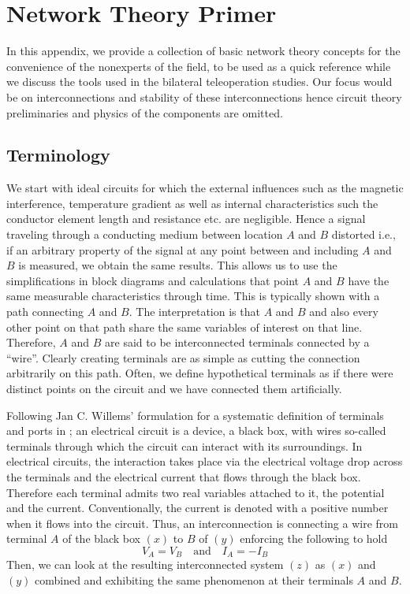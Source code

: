 \chapter{Network Theory Primer}
\label{chap:apdxnetwork}


In this appendix, we provide a collection of basic network theory concepts for the convenience of the nonexperts of the field, 
to be used as a quick reference while we discuss the tools used in the bilateral teleoperation studies. Our focus would be on 
interconnections and stability of these interconnections hence circuit theory preliminaries and physics of the components are omitted.

\section{Terminology}
We start with ideal circuits for which the external influences such as the magnetic interference, temperature gradient as well as 
internal characteristics such the conductor element length and resistance etc. are negligible. Hence a signal traveling through a 
conducting medium between location $A$ and $B$ distorted i.e., if an arbitrary property of the signal at any point between and 
including $A$ and $B$ is measured, we obtain the same results. This allows us to use the simplifications in block diagrams and 
calculations that point $A$ and $B$ have the same measurable characteristics through time. This is typically shown with a path 
connecting $A$ and $B$. The interpretation is that $A$ and $B$ and also every other point on that path share the same variables 
of interest on that line. Therefore, $A$ and $B$ are said to be interconnected terminals connected by a \enquote{wire}. Clearly 
creating terminals are as simple as cutting the connection arbitrarily on this path. Often, we define hypothetical terminals as 
if there were distinct points on the circuit and we have connected them artificially. 

Following Jan C. Willems' formulation for a systematic definition of terminals and ports in \cite{willemsCSM}; an electrical 
circuit is a device, a black box, with wires so-called terminals through which the circuit can interact with its surroundings. 
In electrical circuits, the interaction takes place via the electrical voltage drop across the terminals and the electrical 
current that flows through the black box. Therefore each terminal admits two real variables attached to it, the potential and 
the current. Conventionally, the current is denoted with a positive number when it flows into the circuit. Thus, an 
interconnection is connecting a wire from terminal $A$ of the black box $(x)$ to $B$ of $(y)$ enforcing the following to hold
\[
V_A = V_B \quad \text{and} \quad I_A=-I_B
\]
Then, we can look at the resulting interconnected system $(z)$ as $(x)$ and $(y)$ combined and exhibiting the same phenomenon 
at their terminals $A$ and $B$. 

